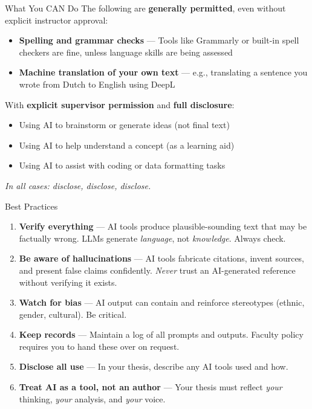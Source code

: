 \documentclass[aspectratio=169,11pt]{beamer}
\begin{document}
\begin{frame}{What You CAN Do}
    The following are \textbf{generally permitted}, even without explicit instructor approval:
    \vspace{0.3cm}
    \begin{itemize}
        \item \textbf{Spelling and grammar checks} --- Tools like Grammarly or built-in spell checkers are fine, unless language skills are being assessed
        \item \textbf{Machine translation of your own text} --- e.g., translating a sentence you wrote from Dutch to English using DeepL
    \end{itemize}
    \vspace{0.3cm}
    With \textbf{explicit supervisor permission} and \textbf{full disclosure}:
    \begin{itemize}
        \item Using AI to brainstorm or generate ideas (not final text)
        \item Using AI to help understand a concept (as a learning aid)
        \item Using AI to assist with coding or data formatting tasks
    \end{itemize}
    \vspace{0.3cm}
    \textit{In all cases: disclose, disclose, disclose.}
\end{frame}

\begin{frame}{Best Practices}
    \begin{enumerate}
        \item \textbf{Verify everything} --- AI tools produce plausible-sounding text that may be factually wrong. LLMs generate \textit{language}, not \textit{knowledge}. Always check.
        \item \textbf{Be aware of hallucinations} --- AI tools fabricate citations, invent sources, and present false claims confidently. \textit{Never} trust an AI-generated reference without verifying it exists.
        \item \textbf{Watch for bias} --- AI output can contain and reinforce stereotypes (ethnic, gender, cultural). Be critical.
        \item \textbf{Keep records} --- Maintain a log of all prompts and outputs. Faculty policy requires you to hand these over on request.
        \item \textbf{Disclose all use} --- In your thesis, describe any AI tools used and how.
        \item \textbf{Treat AI as a tool, not an author} --- Your thesis must reflect \textit{your} thinking, \textit{your} analysis, and \textit{your} voice.
    \end{enumerate}
\end{frame}
\end{document}
